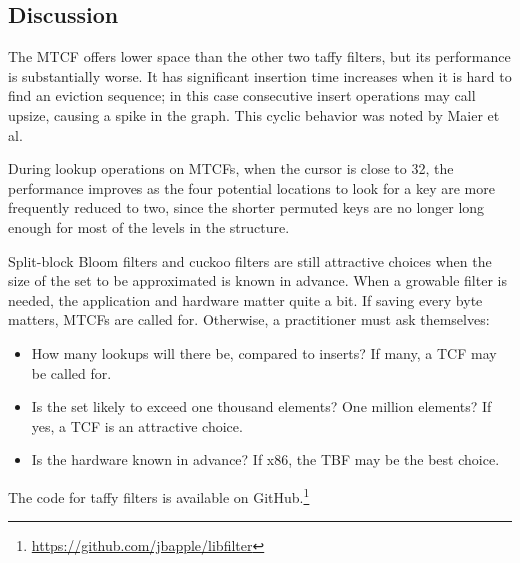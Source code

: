 \documentclass[sigconf, nonacm]{acmart}
\newcommand{\etal}{et al.}
\begin{document}
\subsection{Discussion}

The MTCF offers lower space than the other two taffy filters, but its performance is substantially worse.
It has significant insertion time increases when it is hard to find an eviction sequence; in this case consecutive insert operations may call upsize, causing a spike in the graph.
This cyclic behavior was noted by Maier \etal~\cite{dysect}

During lookup operations on MTCFs, when the cursor is close to 32, the performance improves as the four potential locations to look for a key are more frequently reduced to two, since the shorter permuted keys are no longer long enough for most of the levels in the structure.

Split-block Bloom filters and cuckoo filters are still attractive choices when the size of the set to be approximated is known in advance.
When a growable filter is needed, the application and hardware matter quite a bit.
If saving every byte matters, MTCFs are called for.
Otherwise, a practitioner must ask themselves:

\begin{itemize}
\item How many lookups will there be, compared to inserts?
  If many, a TCF may be called for.
\item Is the set likely to exceed one thousand elements? One million elements?
  If yes, a TCF is an attractive choice.
\item Is the hardware known in advance?
  If x86, the TBF may be the best choice.
\end{itemize}

The code for taffy filters is available on GitHub.\footnote{\url{https://github.com/jbapple/libfilter}}





\end{document}
